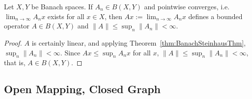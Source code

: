 \begin{corollary}
	\label{cor:MapConverge}
	Let $X, Y$ be Banach spaces. If $A_n \in B(X, Y)$ and pointwise converges, i.e. $\lim_{n \to \infty }A_n x$ exists for all $x \in X$, then $Ax := \lim_{n \to \infty } A_n x$ defines a bounded operator $A \in B(X, Y)$ and $\|A\| \le \sup_n \|A_n\| < \infty $.
\end{corollary}
\begin{proof}
	$A$ is certainly linear, and applying Theorem~\ref{thm:BanachSteinhausThm}, $\sup _n \|A_n\| < \infty $. Since $A x \le \sup _n A_n x$ for all $x$, $\|A\| \le \sup _n\|A_n\|<\infty $, that is, $A \in B(X, Y)$.
\end{proof}





\subsection{Open Mapping, Closed Graph}



